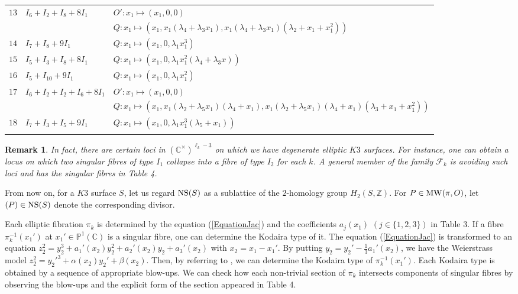 \documentclass[10pt]{article}
\newtheorem{rem}{Remark}[section]
\begin{document}
{\begin{longtable}{lll}
\vspace{1mm}$13$ &$I_6 + I_2 +I_8 +  8I_1 $ & $O': x_1\mapsto (x_1,0,0)$   \\
\vspace{1mm}& & $Q: x_1\mapsto (x_1,x_1(\lambda_4+ \lambda_3 x_1),x_1(\lambda_4+\lambda_3 x_1) (\lambda_2+x_1 + x_1^2))$ \\
\vspace{1mm}$14$ &$I_7 +I_8 + 9 I_1$ & $Q: x_1\mapsto (x_1,0,\lambda_1 x_1^3)$   \\
\vspace{1mm}$15$ &$I_5 +I_3 +I_8 +8I_1$ & $Q: x_1\mapsto (x_1,0,\lambda_1 x_1^2 (\lambda_4 + \lambda_3 x))$   \\
\vspace{1mm}$16$ &$I_5 + I_{10} + 9I_1$ & $Q: x_1\mapsto (x_1,0,\lambda_1 x_1^2 )$   \\
\vspace{1mm}$17$ &$I_6 + I_2 +I_2 + I_6 + 8 I_1$ & $O': x_1\mapsto (x_1,0,0)$   \\
\vspace{1mm}& & $Q: x_1\mapsto (x_1,x_1(\lambda_2+ \lambda_5 x_1) (\lambda_4+x_1),x_1 (\lambda_2+\lambda_5 x_1)(\lambda_4 +x_1)(\lambda_3+x_1 +x_1^2))$ \\
 \vspace{1mm}    $18$ & $I_7 +I_3 +I_5 + 9I_1$ & $Q: x_1\mapsto (x_1,0,\lambda_1 x_1^3 (\lambda_5 +x_1) )$   \\
\hline\\
\end{longtable} 
}


\begin{rem}
In fact, there are certain loci in $(\mathbb{C}^\times)^{\ell_k -3}$ on which we have degenerate elliptic $K3$ surfaces.
For instance, one can obtain a locus on  which two singular fibres of type $I_1$  collapse into a fibre of type $I_2$ for each $k$.
A  general member of the family $\mathscr{F}_k$  is avoiding such loci and  has the singular fibres  in Table 4.
\end{rem}


From now on,
for a $K3$ surface $S$,
let us regard ${\rm NS}(S)$ as a sublattice of the $2$-homology group $H_2(S,\mathbb{Z}).$ 
For $P\in {\rm MW}(\pi,O)$, let $(P) \in {\rm NS}(S)$ denote the corresponding divisor.  

Each elliptic fibration $\pi_k$ is determined by the equation (\ref{EquationJac}) and the coefficients $a_j(x_1)$ $(j\in \{1,2,3\})$ in Table 3.
If  a fibre $\pi_k^{-1} (x_1')$ at $x_1' \in \mathbb{P}^1 (\mathbb{C})$ is a singular fibre,
one can determine the Kodaira type of it.
The equation (\ref{EquationJac}) is transformed to an equation
$z_2^2 = y_2^3 +a_1'(x_2) y_2^2 + a_2'(x_2) y_2 + a_3'(x_2)$ 
with $x_2=x_1-x_1'$.
By putting $y_2 = y_2' - \frac{1}{3} a_1' (x_2)$,
we have the Weierstrass model
$z_2^2 = y_2'^3 + \alpha (x_2) y_2' +\beta(x_2)$.
Then, by referring to \cite{Kod}, we can determine the Kodaira type of $\pi_k^{-1} (x_1')$.
Each Kodaira type is obtained by a sequence of appropriate blow-ups.
We can check how each non-trivial section of $\pi_k$ intersects components of singular fibres
by observing the blow-ups and the explicit form of the section appeared in Table 4.
\end{document}
